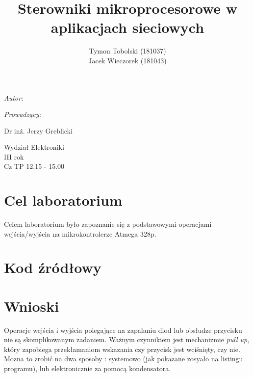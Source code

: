 \documentclass[wide,a4paper,titlepage,12pt] {article}
\title{Sterowniki mikroprocesorowe w aplikacjach sieciowych}
\author{Tymon Tobolski (181037)\\ Jacek Wieczorek (181043)}
\makeatletter
\renewcommand{\maketitle}{
\begin{titlepage}
  \begin{center}
    \vspace*{3cm}
    \LARGE \@title \par
    \vspace{2cm}
    \textit{\small Autor:}\par
    \normalsize \@author\par \normalsize
    \vspace{3cm}
    \textit{\small Prowadzący:}\par
    Dr inż. Jerzy Greblicki \par
    \vspace{2cm}
    Wydział Elektroniki\\ III rok\\ Cz TP 12.15 - 15.00\par

  \end{center}
\end{titlepage}
}
\makeatother
\begin{document}
\maketitle
  \section{Cel laboratorium}
  \paragraph{}
  Celem laboratorium było zapoznanie się z podstawowymi operacjami wejścia/wyjścia na mikrokontrolerze Atmega 328p.

  \section{Kod źródłowy}
  

  \section{Wnioski}
  \paragraph{}
  Operacje wejścia i wyjścia polegające na zapalaniu diod lub obsłudze przycisku nie są skomplikowanym zadaniem. Ważnym czynnikiem jest mechanizmie \textit{pull up}, który zapobiega przekłamaniom wskazania czy przycisk jest wciśnięty, czy nie. Mozna to zrobić na dwa sposoby : systemowo (jak pokazane zosyało na listingu programu), lub elektronicznie za pomocą kondensatora.
\end{document}
